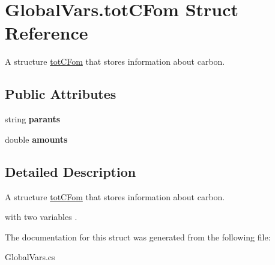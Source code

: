 \hypertarget{struct_global_vars_1_1tot_c_fom}{}\section{Global\+Vars.\+tot\+C\+Fom Struct Reference}
\label{struct_global_vars_1_1tot_c_fom}


A structure \mbox{\hyperlink{struct_global_vars_1_1tot_c_fom}{tot\+C\+Fom}} that stores information about carbon.  


\subsection*{Public Attributes}
\begin{DoxyCompactItemize}
\item 
\mbox{\label{struct_global_vars_1_1tot_c_fom_a54ecf640fa80c336e59aba044c496551}} 
string {\bfseries parants}
\item 
\mbox{\label{struct_global_vars_1_1tot_c_fom_a193b141d45c969537058a8b5ecbfe45c}} 
double {\bfseries amounts}
\end{DoxyCompactItemize}


\subsection{Detailed Description}
A structure \mbox{\hyperlink{struct_global_vars_1_1tot_c_fom}{tot\+C\+Fom}} that stores information about carbon. 

with two variables . 

The documentation for this struct was generated from the following file\+:\begin{DoxyCompactItemize}
\item 
Global\+Vars.\+cs\end{DoxyCompactItemize}

